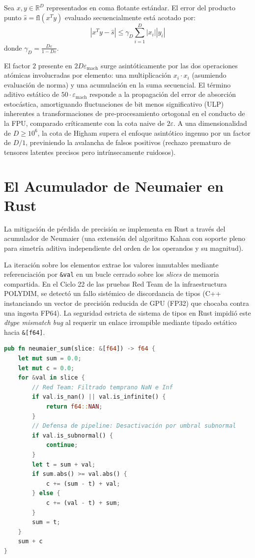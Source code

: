 \begin{theorem}
Sea $x, y \in \mathbb{R}^D$ representados en coma flotante estándar. El error del producto punto $\widehat{s} = \text{fl}(x^T y)$ evaluado secuencialmente está acotado por:
\begin{equation}
| x^T y - \widehat{s} | \le \gamma_D \sum_{i=1}^D |x_i||y_i|
\end{equation}
donde $\gamma_D = \frac{D \varepsilon}{1 - D \varepsilon}$.
\end{theorem}

El factor $2$ presente en $2D\varepsilon_{\text{mach}}$ surge asintóticamente por las dos operaciones atómicas involucradas por elemento: una multiplicación $x_i \cdot x_i$ (asumiendo evaluación de norma) y una acumulación en la suma secuencial. El término aditivo estático de $50 \cdot \varepsilon_{\text{mach}}$ responde a la propagación del error de absorción estocástica, amortiguando fluctuaciones de bit menos significativo (ULP) inherentes a transformaciones de pre-procesamiento ortogonal en el conducto de la FPU, comparado críticamente con la cota naive de $2\varepsilon$. A una dimensionalidad de $D \ge 10^6$, la cota de Higham supera el enfoque asintótico ingenuo por un factor de $D/1$, previniendo la avalancha de falsos positivos (rechazo prematuro de tensores latentes precisos pero intrínsecamente ruidosos).

\section{El Acumulador de Neumaier en Rust}

La mitigación de pérdida de precisión se implementa en Rust a través del acumulador de Neumaier (una extensión del algoritmo Kahan con soporte pleno para simetría aditiva independiente del orden de los operandos y su magnitud).

La iteración sobre los elementos extrae los valores inmutables mediante referenciación por \texttt{\&val} en un bucle cerrado sobre los \textit{slices} de memoria compartida. En el Ciclo 22 de las pruebas Red Team de la infraestructura POLYDIM, se detectó un fallo sistémico de discordancia de tipos (C++ instanciando un vector de precisión reducida de GPU (FP32) que chocaba contra una ingesta FP64). La seguridad estricta de sistema de tipos en Rust impidió este \textit{dtype mismatch bug} al requerir un enlace irrompible mediante tipado estático hacia \texttt{\&[f64]}.

\begin{lstlisting}[language=Rust, caption={Acumulador de Neumaier y Filtros de Sanitización FPU}]
pub fn neumaier_sum(slice: &[f64]) -> f64 {
    let mut sum = 0.0;
    let mut c = 0.0;
    for &val in slice {
        // Red Team: Filtrado temprano NaN e Inf
        if val.is_nan() || val.is_infinite() {
            return f64::NAN;
        }
        // Defensa de pipeline: Desactivación por umbral subnormal
        if val.is_subnormal() {
            continue; 
        }
        let t = sum + val;
        if sum.abs() >= val.abs() {
            c += (sum - t) + val;
        } else {
            c += (val - t) + sum;
        }
        sum = t;
    }
    sum + c
}
\end{lstlisting}

